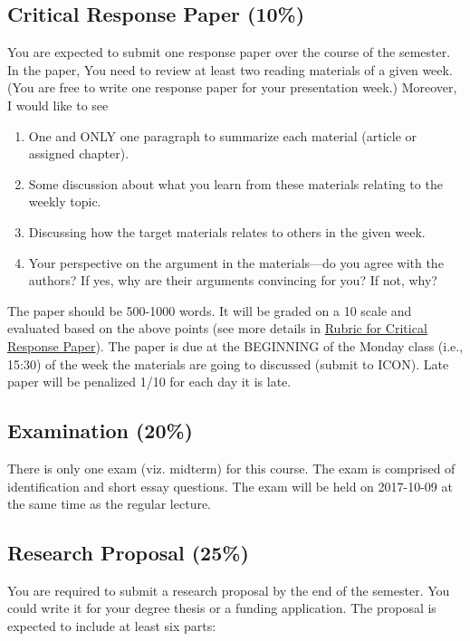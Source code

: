 \documentclass[11pt,]{article}
\providecommand{\tightlist}{%
  \setlength{\itemsep}{0pt}\setlength{\parskip}{0pt}}
\theoremstyle{definition}
\theoremstyle{definition}
\theoremstyle{definition}
\theoremstyle{remark}
\begin{document}
\subsection{Critical Response Paper
(10\%)}\label{critical-response-paper-10}

You are expected to submit one response paper over the course of the
semester. In the paper, You need to review at least two reading
materials of a given week. (You are free to write one response paper for
your presentation week.) Moreover, I would like to see

\begin{enumerate}
\def\labelenumi{\arabic{enumi}.}
\tightlist
\item
  One and ONLY one paragraph to summarize each material (article or
  assigned chapter).
\item
  Some discussion about what you learn from these materials relating to
  the weekly topic.
\item
  Discussing how the target materials relates to others in the given
  week.
\item
  Your perspective on the argument in the materials---do you agree with
  the authors? If yes, why are their arguments convincing for you? If
  not, why?
\end{enumerate}

The paper should be 500-1000 words. It will be graded on a 10 scale and
evaluated based on the above points (see more details in
\protect\hyperlink{id}{Rubric for Critical Response Paper}). The paper
is due at the BEGINNING of the Monday class (i.e., 15:30) of the week
the materials are going to discussed (submit to ICON). Late paper will
be penalized 1/10 for each day it is late.

\subsection{Examination (20\%)}\label{examination-20}

There is only one exam (viz. midterm) for this course. The exam is
comprised of identification and short essay questions. The exam will be
held on 2017-10-09 at the same time as the regular lecture.

\subsection{Research Proposal (25\%)}\label{research-proposal-25}

You are required to submit a research proposal by the end of the
semester. You could write it for your degree thesis or a funding
application. The proposal is expected to include at least six parts:
\end{document}
